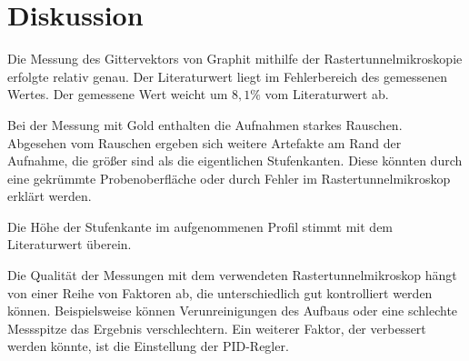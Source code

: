\section{Diskussion}

Die Messung des Gittervektors von Graphit mithilfe der Rastertunnelmikroskopie erfolgte relativ genau.
Der Literaturwert liegt im Fehlerbereich des gemessenen Wertes.
Der gemessene Wert weicht um $8,1\%$ vom Literaturwert ab.

Bei der Messung mit Gold enthalten die Aufnahmen starkes Rauschen.
Abgesehen vom Rauschen ergeben sich weitere Artefakte am Rand der Aufnahme, die größer sind als die eigentlichen Stufenkanten.
Diese könnten durch eine gekrümmte Probenoberfläche oder durch Fehler im Rastertunnelmikroskop erklärt werden.

Die Höhe der Stufenkante im aufgenommenen Profil stimmt mit dem Literaturwert überein.

Die Qualität der Messungen mit dem verwendeten Rastertunnelmikroskop hängt von einer Reihe von Faktoren ab, die unterschiedlich gut kontrolliert werden können.
Beispielsweise können Verunreinigungen des Aufbaus oder eine schlechte Messspitze das Ergebnis verschlechtern.
Ein weiterer Faktor, der verbessert werden könnte, ist die Einstellung der PID-Regler.